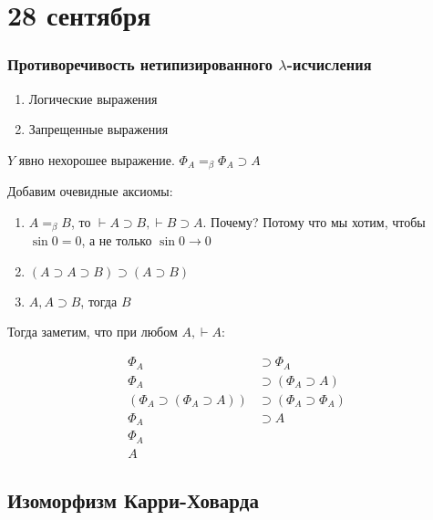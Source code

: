 \chapter{28 сентября}

\subsection{Противоречивость нетипизированного \(\lambda\)-исчисления}

\?

\begin{enumerate}
    \item Логические выражения
    \item Запрещенные выражения
\end{enumerate}


\(Y\) явно нехорошее выражение. \(\Phi_A =_\beta \Phi_A \supset A\)

Добавим очевидные аксиомы:
\begin{enumerate}
    \item \(A =_\beta B\), то \( \vdash A \supset B, \vdash B \supset A\). Почему? Потому что мы хотим, чтобы \(\sin 0 = 0\), а не только \(\sin 0 \to 0\)
    \item \((A \supset A \supset B) \supset (A \supset B)\)
    \item \(A, A \supset B\), тогда \(B\)
\end{enumerate}

Тогда заметим, что при любом \(A, \vdash A\):

\begin{align*}
    \Phi_A & \supset \Phi_A \\
    \Phi_A & \supset (\Phi_A \supset A) \\
    (\Phi_A \supset (\Phi_A \supset A)) & \supset (\Phi_A \supset \Phi_A) \\
    \Phi_A & \supset A \\
    \Phi_A \\
    A
\end{align*}

\section{Изоморфизм Карри-Ховарда}

